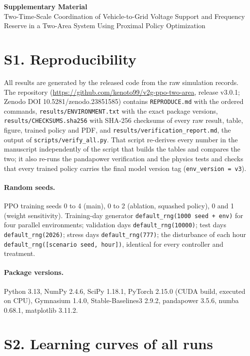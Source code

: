 \documentclass[10pt,a4paper]{article}
\begin{document}
\begin{center}
{\large\bfseries Supplementary Material}\\[3pt]
Two-Time-Scale Coordination of Vehicle-to-Grid Voltage Support and Frequency Reserve in a Two-Area System Using Proximal Policy Optimization
\end{center}

\section*{S1. Reproducibility}

All results are generated by the released code from the raw simulation records. The repository
(\url{https://github.com/kenoto99/v2g-ppo-two-area}, release v3.0.1; Zenodo DOI 10.5281/zenodo.23851585)
contains \texttt{REPRODUCE.md} with the ordered commands, \texttt{results/ENVIRONMENT.txt} with the exact
package versions, \texttt{results/CHECKSUMS.sha256} with SHA-256 checksums of every raw result, table, figure,
trained policy and PDF, and \texttt{results/verification\_report.md}, the output of \texttt{scripts/verify\_all.py}.
That script re-derives every number in the manuscript independently of the script that builds the tables and
compares the two; it also re-runs the pandapower verification and the physics tests and checks that every
trained policy carries the final model version tag (\texttt{env\_version = v3}).

\paragraph{Random seeds.} PPO training seeds 0 to 4 (main), 0 to 2 (ablation, squashed policy), 0 and 1
(weight sensitivity). Training-day generator \texttt{default\_rng(1000\,seed + env)} for four parallel
environments; validation days \texttt{default\_rng(10000)}; test days \texttt{default\_rng(2026)}; stress days
\texttt{default\_rng(777)}; the disturbance of each hour \texttt{default\_rng([scenario seed, hour])}, identical
for every controller and treatment.

\paragraph{Package versions.} Python 3.13, NumPy 2.4.6, SciPy 1.18.1, PyTorch 2.15.0 (CUDA build, executed on CPU), Gymnasium 1.4.0,
Stable-Baselines3 2.9.2, pandapower 3.5.6, numba 0.68.1, matplotlib 3.11.2.

\section*{S2. Learning curves of all runs}
\end{document}
